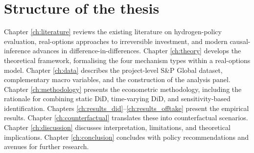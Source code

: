 \section{Structure of the thesis}

Chapter \ref{ch:literature} reviews the existing literature on hydrogen-policy evaluation, real-options approaches to irreversible investment, and modern causal-inference advances in difference-in-differences. Chapter \ref{ch:theory} develops the theoretical framework, formalising the four mechanism types within a real-options model. Chapter \ref{ch:data} describes the project-level S\&P Global dataset, complementary macro variables, and the construction of the analysis panel. Chapter \ref{ch:methodology} presents the econometric methodology, including the rationale for combining static DiD, time-varying DiD, and sensitivity-based identification. Chapters \ref{ch:results_did}--\ref{ch:results_offtake} present the empirical results. Chapter \ref{ch:counterfactual} translates these into counterfactual scenarios. Chapter \ref{ch:discussion} discusses interpretation, limitations, and theoretical implications. Chapter \ref{ch:conclusion} concludes with policy recommendations and avenues for further research.
